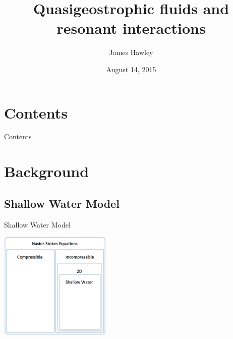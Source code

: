 \documentclass{beamer}
\title{Quasigeostrophic fluids and resonant interactions}
\author{James Hawley}
\date{August 14, 2015}
\institute{University of Waterloo}
\begin{document}
	\begin{frame}
		\titlepage
	\end{frame}

	\section*{Contents}
		\begin{frame}{Contents}
			\tableofcontents
		\end{frame}

	\section{Background}
		\subsection{Shallow Water Model}
			\begin{frame}[t]{Shallow Water Model}
				\begin{center}
					\includegraphics[width=0.4\textwidth]{nested_models_sw.png}
				\end{center}
			\end{frame}
\end{document}
